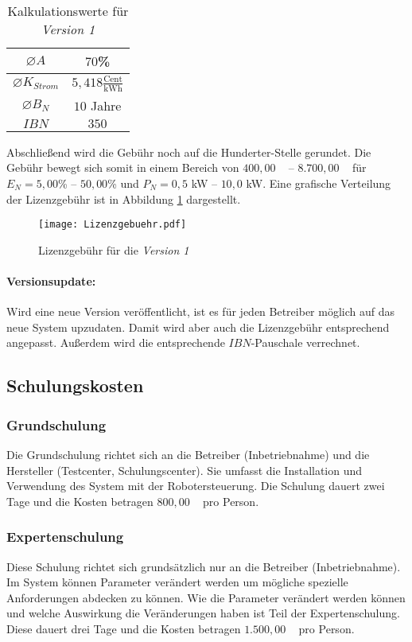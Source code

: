\begin{table}[h]
	\centering
	\begin{tabular}{|c|c|}
		\hline 
		$\varnothing A$ & $70$\% \\ 
		\hline 
		$\varnothing K_{Strom}$ & $5,418\frac{\text{Cent}}{\text{kWh}}$ \\ 
		\hline
		$\varnothing B_N$ & $10$ Jahre \\ 
		\hline 
		$IBN$ & $350$\officialeuro \\ 
		\hline 
	\end{tabular}
	\caption{Kalkulationswerte für \textit{Version 1}}
	\label{tab:Kalkulationswerte}
\end{table}
Abschließend wird die Gebühr noch auf die Hunderter-Stelle gerundet. Die Gebühr bewegt sich somit in einem Bereich von $400,00$ \officialeuro~ -- $8.700,00$ \officialeuro~ für $E_N = 5,00$\% -- $50,00$\% und $P_N = 0,5$ kW -- $10,0$ kW. Eine grafische Verteilung der Lizenzgebühr ist in Abbildung \ref{fig:lizenzgebuehr} dargestellt.

\begin{figure}[h]
	\centering
	\texttt{[image: Lizenzgebuehr.pdf]}
	\caption{Lizenzgebühr für die \textit{Version 1}}
	\label{fig:lizenzgebuehr}
\end{figure}

\paragraph*{Versionsupdate:}
Wird eine neue Version veröffentlicht, ist es für jeden Betreiber möglich auf das neue System upzudaten. Damit wird aber auch die Lizenzgebühr entsprechend angepasst. Außerdem wird die entsprechende $IBN$-Pauschale verrechnet.

\subsection{Schulungskosten}
\subsubsection{Grundschulung}
Die Grundschulung richtet sich an die Betreiber (Inbetriebnahme) und die Hersteller (Testcenter, Schulungscenter). Sie umfasst die Installation und Verwendung des System mit der Robotersteuerung. Die Schulung dauert zwei Tage und die Kosten betragen $800,00$ \officialeuro~ pro Person. 

\subsubsection{Expertenschulung}
Diese Schulung richtet sich grundsätzlich nur an die Betreiber (Inbetriebnahme). Im System können Parameter verändert werden um mögliche spezielle Anforderungen abdecken zu können. Wie die Parameter verändert werden können und welche Auswirkung die Veränderungen haben ist Teil der Expertenschulung. Diese dauert drei Tage und die Kosten betragen $1.500,00$ \officialeuro~ pro Person.

